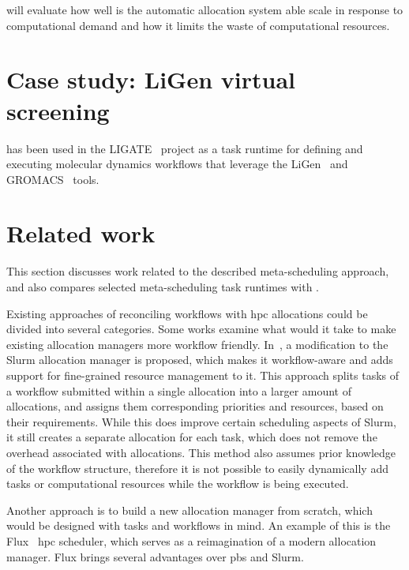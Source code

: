 
 will evaluate how well is the automatic allocation system able
scale in response to computational demand and how it limits the waste of computational resources.

\section{Case study: LiGen virtual screening}
\hyperqueue{} has been used in the LIGATE~\cite{ligate} project as a task runtime for defining and executing molecular
dynamics workflows that leverage the LiGen~\cite{TODO} and GROMACS~\cite{TODO} tools.

\section{Related work}
\label{hq:related-work}
This section discusses work related to the described meta-scheduling approach, and also compares
selected meta-scheduling task runtimes with \hyperqueue{}.

Existing approaches of reconciling workflows with \gls{hpc} allocations could be
divided into several categories. Some works examine what would it take to make existing allocation
managers more workflow friendly. In~\cite{slurm-workflow}, a modification to the Slurm allocation
manager is proposed, which makes it workflow-aware and adds support for fine-grained resource
management to it. This approach splits tasks of a workflow submitted within a single allocation
into a larger amount of allocations, and assigns them corresponding priorities and resources, based
on their requirements. While this does improve certain scheduling aspects of Slurm, it still
creates a separate allocation for each task, which does not remove the overhead associated with
allocations. This method also assumes prior knowledge of the workflow structure, therefore it is
not possible to easily dynamically add tasks or computational resources while the workflow is being
executed.

Another approach is to build a new allocation manager from scratch, which would be designed with
tasks and workflows in mind. An example of this is the Flux~\cite{flux}
\gls{hpc} scheduler, which serves as a reimagination of a modern allocation manager.
Flux brings several advantages over \gls{pbs} and Slurm.


